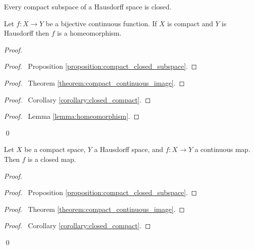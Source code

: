 \begin{corollary}
    \label{corollary:closed_compact}
    Every compact subspace of a Hausdorff space is closed.
\end{corollary}

\begin{theorem}
    Let $f : X \rightarrow Y$ be a bijective continuous function. If $X$ is
    compact and $Y$ is Hausdorff then $f$ is a homeomorphism.
\end{theorem}

\begin{proof}
    \pf
    \begin{proof}
        \pf\ Proposition \ref{proposition:compact_closed_subspace}.
    \end{proof}
    \begin{proof}
        \pf\ Theorem \ref{theorem:compact_continuous_image}.
    \end{proof}
    \begin{proof}
        \pf\ Corollary \ref{corollary:closed_compact}.
    \end{proof}
    \qedstep
    \begin{proof}
        \pf\ Lemma \ref{lemma:homeomorphism}.
    \end{proof}
    \qed
\end{proof}

\begin{proposition}
    Let $X$ be a compact space, $Y$ a Hausdorff space, and $f : X \rightarrow Y$
    a continuous map. Then $f$ is a closed map.
\end{proposition}

\begin{proof}
    \pf
    \begin{proof}
        \pf\ Proposition \ref{proposition:compact_closed_subspace}.
    \end{proof}
    \begin{proof}
        \pf\ Theorem \ref{theorem:compact_continuous_image}.
    \end{proof}
    \begin{proof}
        \pf\ Corollary \ref{corollary:closed_compact}.
    \end{proof}
    \qed
\end{proof}

